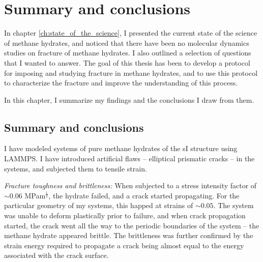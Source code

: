 \chapter{Summary and conclusions}
\label{ch:summary_conclusions}
In chapter \ref{ch:state_of_the_science}, I presented the current state of the science of methane hydrates, and noticed that there have been no molecular dynamics studies on fracture of methane hydrates. I also outlined a selection of questions that I wanted to answer. The goal of this thesis has been to develop a protocol for imposing and studying fracture in methane hydrates, and to use this protocol to characterize the fracture and improve the understanding of this process. 

In this chapter, I summarize my findings and the conclusions I draw from them.

\section{Summary and conclusions}

I have modeled systems of pure methane hydrates of the sI structure using LAMMPS. I have introduced artificial flaws -- elliptical prismatic cracks -- in the systems, and subjected them to tensile strain. 

\textit{Fracture toughness and brittleness:} When subjected to a stress intensity factor of $\sim 0.06$ MPam$^{\frac{1}{2}}$, the hydrate failed, and a crack started propagating. For the particular geometry of my systems, this happed at strains of $\sim 0.05$. The system was unable to deform plastically prior to failure, and when crack propagation started, the crack went all the way to the periodic boundaries of the system -- the methane hydrate appeared brittle. The brittleness was further confirmed by the strain energy required to propagate a crack being almost equal to the energy associated with the crack surface. 

